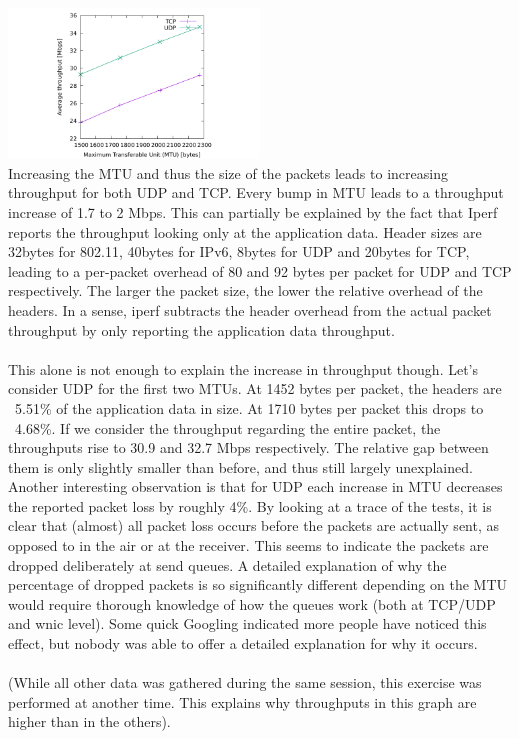 \includegraphics[width=0.5\textwidth]{traces/L3-4-1-tput.pdf} \\
Increasing the MTU and thus the size of the packets leads to increasing throughput for both UDP and TCP. Every bump in MTU leads to a throughput increase of 1.7 to 2 Mbps. This can partially be explained by the fact that Iperf reports the throughput looking only at the application data. Header sizes are 32bytes for 802.11, 40bytes for IPv6, 8bytes for UDP and 20bytes for TCP, leading to a per-packet overhead of 80 and 92 bytes per packet for UDP and TCP respectively. The larger the packet size, the lower the relative overhead of the headers. In a sense, iperf subtracts the header overhead from the actual packet throughput by only reporting the application data throughput.
\\ \\ This alone is not enough to explain the increase in throughput though. Let's consider UDP for the first two MTUs. At 1452 bytes per packet, the headers are ~5.51\% of the application data in size. At 1710 bytes per packet this drops to ~4.68\%. If we consider the throughput regarding the entire packet, the throughputs rise to 30.9 and 32.7 Mbps respectively. The relative gap between them is only slightly smaller than before, and thus still largely unexplained. Another interesting observation is that for UDP each increase in MTU decreases the reported packet loss by roughly 4\%. By looking at a trace of the tests, it is clear that (almost) all packet loss occurs before the packets are actually sent, as opposed to in the air or at the receiver. This seems to indicate the packets are dropped deliberately at send queues. A detailed explanation of why the percentage of dropped packets is so significantly different depending on the MTU would require thorough knowledge of how the queues work (both at TCP/UDP and wnic level). Some quick Googling indicated more people have noticed this effect, but nobody was able to offer a detailed explanation for why it occurs. \\ \\
(While all other data was gathered during the same session, this exercise was performed at another time. This explains why throughputs in this graph are higher than in the others).
